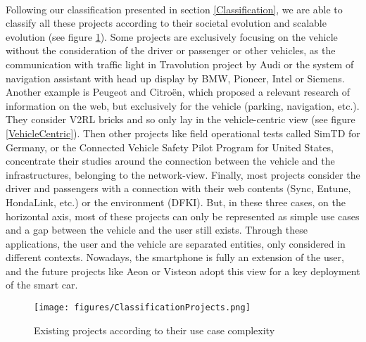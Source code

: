 \documentclass[a4paper]{article}
\begin{document}
\paragraph{}Following our classification presented in section \ref{Classification}, we are able to classify all these projects according to their societal evolution and scalable evolution (see figure \ref{classification}). Some projects are exclusively focusing on the vehicle without the consideration of the driver or passenger or other vehicles, as the communication with traffic light in Travolution project by Audi or the system of navigation assistant with head up display by BMW, Pioneer, Intel or Siemens. Another example is Peugeot and Citro\"en, which proposed a relevant research of information on the web, but exclusively for the vehicle (parking, navigation, etc.). They consider V2RL bricks and so only lay in the vehicle-centric view (see figure \ref{VehicleCentric}). Then other projects like field operational tests called SimTD for Germany, or the Connected Vehicle Safety Pilot Program for United States, concentrate their studies around the connection between the vehicle and the infrastructures, belonging to the network-view. Finally, most projects consider the driver and passengers with a connection with their web contents (Sync, Entune, HondaLink, etc.) or the environment (DFKI). But, in these three cases, on the horizontal axis, most of these projects can only be represented as simple use cases and a gap between the vehicle and the user still exists. Through these applications, the user and the vehicle are separated entities, only considered in different contexts. Nowadays, the smartphone is fully an extension of the user, and the future projects like Aeon or Visteon adopt this view for a key deployment of the smart car.
\begin{figure}[!htb]
\begin{center}
\texttt{[image: figures/ClassificationProjects.png]}
\caption{Existing projects according to their use case complexity}
\label{classification}
\end{center}
\end{figure}
\end{document}
